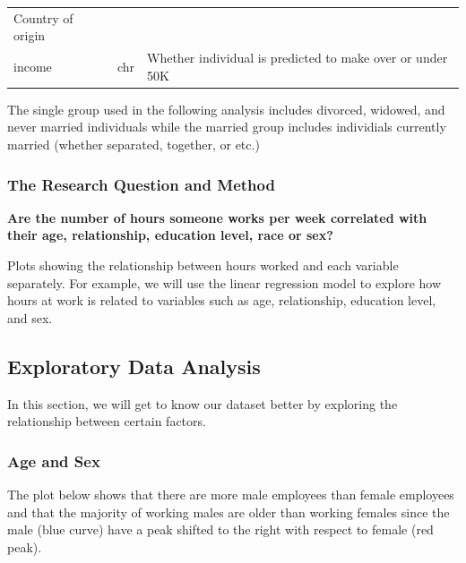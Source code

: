 \documentclass[]{article}
\begin{document}
\begin{longtable}[]{@{}lll@{}}
\begin{minipage}[t]{0.26\columnwidth}
Country of origin\strut
\end{minipage}\tabularnewline
\begin{minipage}[t]{0.35\columnwidth}\raggedright
income\strut
\end{minipage} & \begin{minipage}[t]{0.30\columnwidth}\raggedright
chr\strut
\end{minipage} & \begin{minipage}[t]{0.26\columnwidth}\raggedright
Whether individual is predicted to make over or under 50K\strut
\end{minipage}\tabularnewline
\bottomrule
\end{longtable}

The single group used in the following analysis includes divorced,
widowed, and never married individuals while the married group includes
individials currently married (whether separated, together, or etc.)

\hypertarget{the-research-question-and-method}{%
\subsubsection{The Research Question and
Method}\label{the-research-question-and-method}}

\textbf{Are the number of hours someone works per week correlated with
their age, relationship, education level, race or sex?}

Plots showing the relationship between hours worked and each variable
separately. For example, we will use the linear regression model to
explore how hours at work is related to variables such as age,
relationship, education level, and sex.

\hypertarget{exploratory-data-analysis}{%
\subsection{Exploratory Data Analysis}\label{exploratory-data-analysis}}

In this section, we will get to know our dataset better by exploring the
relationship between certain factors.

\hypertarget{age-and-sex}{%
\subsubsection{Age and Sex}\label{age-and-sex}}

The plot below shows that there are more male employees than female
employees and that the majority of working males are older than working
females since the male (blue curve) have a peak shifted to the right
with respect to female (red peak).
\end{document}
